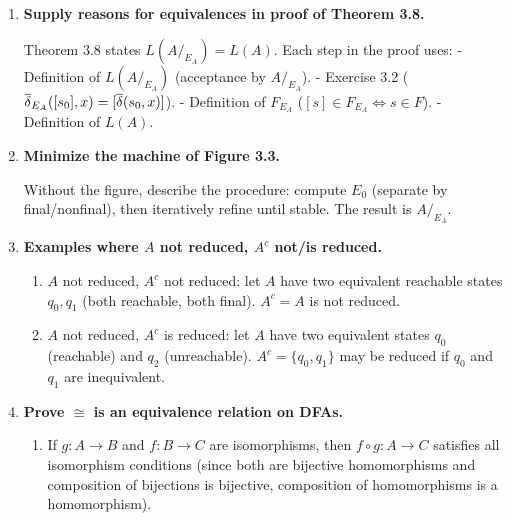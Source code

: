 \begin{enumerate}[{3.}1.]
In that step, we used $\DBAR_A(s,x)\in F_A\Rightarrow\mu(\DBAR_A(s,x))\in F_B$. The converse would require $\mu(s)\in F_B\Rightarrow s\in F_A$, which is the definition of a homomorphism (both directions). If $\mu$ is only required to satisfy $s\in F_A\Rightarrow\mu(s)\in F_B$ (not $\Leftarrow$), then we only get $L(A)\subseteq L(B)$, not equality. Example: $A$ has states $\{q_0,q_1\}$, $F_A=\{q_1\}$; $B$ has $\{p_0\}$, $F_B=\{p_0\}$ (all final); $\mu(q_i)=p_0$. Then $L(A)\subset L(B)=\Sigma^*$.

\item \textbf{Supply reasons for equivalences in proof of Theorem 3.8.}

Theorem 3.8 states $L(A/_{E_A})=L(A)$. Each step in the proof uses:
- Definition of $L(A/_{E_A})$ (acceptance by $A/_{E_A}$).
- Exercise 3.2 ($\overline{\delta}_{E_A}([s_0],x)=[\overline{\delta}(s_0,x)]$).
- Definition of $F_{E_A}$ ($[s]\in F_{E_A}\Leftrightarrow s\in F$).
- Definition of $L(A)$.

\item \textbf{Minimize the machine of Figure 3.3.}

Without the figure, describe the procedure: compute $E_0$ (separate by final/nonfinal), then iteratively refine until stable. The result is $A/_{E_A}$.

\item \textbf{Examples where $A$ not reduced, $A^c$ not/is reduced.}

\begin{enumerate}
\item $A$ not reduced, $A^c$ not reduced: let $A$ have two equivalent reachable states $q_0,q_1$ (both reachable, both final). $A^c=A$ is not reduced.

\item $A$ not reduced, $A^c$ is reduced: let $A$ have two equivalent states $q_0$ (reachable) and $q_2$ (unreachable). $A^c=\{q_0,q_1\}$ may be reduced if $q_0$ and $q_1$ are inequivalent.
\end{enumerate}

\item \textbf{Prove $\cong$ is an equivalence relation on DFAs.}

\begin{enumerate}
\item If $g: A\to B$ and $f: B\to C$ are isomorphisms, then $f\circ g: A\to C$ satisfies all isomorphism conditions (since both are bijective homomorphisms and composition of bijections is bijective, composition of homomorphisms is a homomorphism).


\end{enumerate}
\end{enumerate}

